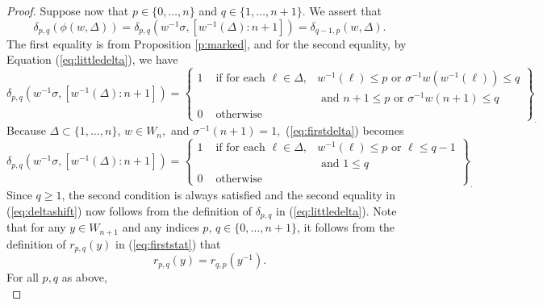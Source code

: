 \documentclass[12pt]{amsart}
\numberwithin{equation}{section}
\newcommand{\Wn}{{W}_n}
\newcommand{\cW}{{ W}}
\begin{document}
\begin{proof}
Suppose now that $p\in\{0,\dots, n\}$ and $q\in\{1,\dots, n+1\}.$  We assert that 
\begin{equation} \label{eq:deltashift}
\delta_{p,q}(\phi(w,\Delta))=\delta_{p,q}(w^{-1}\sigma, [w^{-1}(\Delta): n+1])=\delta_{q-1, p}(w,\Delta).
\end{equation}
The first equality is from Proposition \ref{p:marked}, and for the second equality, by Equation (\ref{eq:littledelta}), we have 
\begin{equation}\label{eq:firstdelta}
\delta_{p,q}(w^{-1}\sigma, [w^{-1}(\Delta): n+1])=\left\{\begin{array}{ccc} 1 & \mbox { if for each } \ell\in\Delta, & w^{-1}(\ell)\leq p \mbox{ or } \sigma^{-1}w(w^{-1}(\ell))\leq q \\
&\;\;\;\;\;\;\;\;\;\;\;\;\;\;\;\;\;\;\;  & \mbox{ and } n+1\leq p\mbox{ or } \sigma^{-1}w(n+1)\leq q\\
0 &\mbox{ otherwise } & \end{array}\right\}_{.}
\end{equation}
Because $\Delta\subset\{1,\dots, n\}$, $w\in\Wn,$ and $\sigma^{-1}(n+1)=1,$  (\ref{eq:firstdelta}) becomes
\begin{equation}\label{eq:seconddelta}
\delta_{p,q}(w^{-1}\sigma, [w^{-1}(\Delta): n+1])=\left\{\begin{array}{ccc} 1 & \mbox { if for each } \ell\in\Delta, & w^{-1}(\ell)\leq p \mbox{ or } \ell\leq q-1 \\
&\;\;\;\;\;\;\;\;\;\;\;\;\;\;\;\;\;\;\;   & \mbox{ and } 1\leq q\;\;\;\;\;\;\;\;\;\;\;\;\;\;\;\;\;\;\;\;\;\;\;\;\;\\
0 &\mbox{ otherwise } & \end{array}\right\}_{.}
\end{equation}
Since $q\geq 1$, the second condition is always satisfied and the second equality in (\ref{eq:deltashift}) now follows from the definition of $\delta_{p,q}$ in (\ref{eq:littledelta}). 
Note that for any $y\in \cW_{n+1}$ and any indices $p,\, q\in \{0,\dots, n+1\}$, it follows from the definition of $r_{p,q}(y)$ in (\ref{eq:firststat}) 
 that 
\begin{equation}\label{eq:rpqinv}
r_{p,q}(y)=r_{q,p}(y^{-1}).
\end{equation}  
For all $p, q$ as above,  
\begin{equation*}

\end{equation*}
\end{proof}
\end{document}
